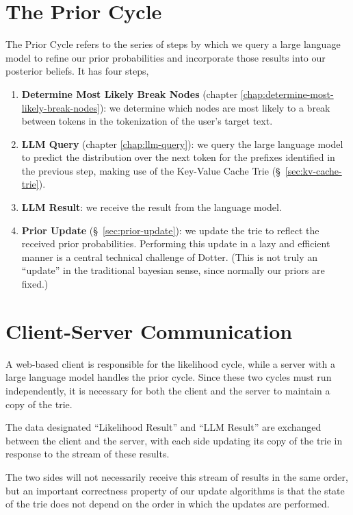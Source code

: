 \section{The Prior Cycle}
The Prior Cycle refers to the series of steps by which we 
query a large language model to refine our prior probabilities
and incorporate those results into our posterior beliefs.
It has four steps,
\begin{enumerate}
  \item \textbf{Determine Most Likely Break Nodes} (chapter \ref{chap:determine-most-likely-break-nodes}): we determine which nodes are most likely
  to a break between tokens in the tokenization of the user's target text.
  \item \textbf{LLM Query} (chapter \ref{chap:llm-query}): we query the large language model to predict the distribution over the next token for the prefixes
  identified in the previous step, making use of the Key-Value Cache Trie (\S~\ref{sec:kv-cache-trie}).
  \item \textbf{LLM Result}: we receive the result from the language model.
  \item \textbf{Prior Update} (\S~\ref{sec:prior-update}): we update the trie to reflect the received prior probabilities.
  Performing this update in a lazy and efficient manner is a central technical
  challenge of Dotter.
  (This is not truly an ``update'' in the traditional bayesian sense, since normally our priors are fixed.)
\end{enumerate}

\section{Client-Server Communication}
A web-based client is responsible for the likelihood cycle,
while a server with a large language model handles the prior cycle.
Since these two cycles must run independently, it is necessary for both the client and
the server to maintain a copy of the trie.

The data designated ``Likelihood Result'' and ``LLM Result'' are exchanged between the client and the server,
with each side updating its copy of the trie in response to the stream of these results.

The two sides will not necessarily receive this stream of results in the same order,
but an important correctness property of our update algorithms is that the state of the trie
does not depend on the order in which the updates are performed.
